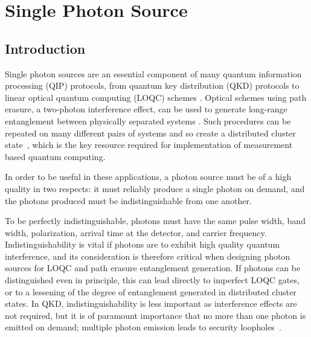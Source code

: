 \chapter{Single Photon Source} 
\label{ch:SinglePhotonSource}

\section{Introduction}

Single photon sources are an essential component of many quantum information processing (QIP) protocols, from quantum key distribution (QKD) protocols \cite{bennett_brassard_84, ekert_91} to linear optical quantum computing (LOQC) schemes \cite{knill:2001, kok07, kok10}.
Optical schemes using path erasure, a two-photon interference effect, can be used to generate long-range entanglement between physically separated systems  \cite{barrett+kok, bose99, simon:03, lim05}. Such procedures can be repeated on many different pairs of systems and so create a distributed cluster state~\cite{raussendorf01,kok10}, which is the key resource required for implementation of measurement based quantum computing.

In order to be useful in these applications, a photon source must be of a high quality in two respects: it must reliably produce a single photon on demand, and the photons produced must be indistinguishable from one another. 

To be perfectly indistinguishable, photons must have the same pulse width, band width, polarization, arrival time at the detector, and carrier frequency. Indistinguishability is vital if photons are to exhibit high quality quantum interference, and its consideration is therefore critical when designing photon sources for LOQC and path erasure entanglement generation.
If photons can be distinguished even in principle, this can lead directly to imperfect LOQC gates, or to a lessening of the degree of entanglement generated in distributed cluster states. In QKD, indistinguishability is less important as interference effects are not required, but it is of paramount importance that no more than one photon is emitted on demand; multiple photon emission leads to security loopholes~\cite{kok10}.


